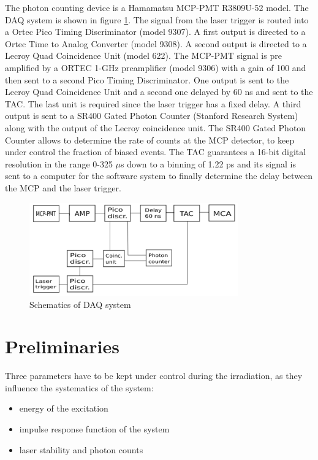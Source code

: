 The photon counting device is a Hamamatsu MCP-PMT R3809U-52 model. The DAQ system is shown in figure \ref{fig:daq}.
The signal from the laser trigger is routed into a Ortec Pico Timing Discriminator (model 9307). A first output is directed to a Ortec Time to Analog Converter (model 9308).
A second output is directed to a Lecroy Quad Coincidence Unit (model 622).
The MCP-PMT signal is pre amplified by a ORTEC 1-GHz preamplifier (model 9306) with a gain of 100 and then sent to a second Pico Timing Discriminator. One output is sent to the Lecroy Quad Coincidence Unit and a second one delayed by 60 ns and sent to the TAC. The last unit is required since the laser trigger has a fixed delay. 
A third output is sent to a SR400 Gated Photon Counter (Stanford Research System) along with the output of the Lecroy coincidence unit.
The SR400 Gated Photon Counter allows to determine the rate of counts at the MCP detector, to keep under control the fraction of biased events.
The TAC guarantees a 16-bit digital resolution in the range 0-325 $\mu$s down to a binning of 1.22 ps and its signal is sent to a computer for the software system to finally determine the delay between the MCP and the laser trigger.
\begin{figure}[htbp]
\begin{center}
\includegraphics[width=9cm]{../Pictures/Chapter_7/electronics.pdf}
\end{center}
\caption[VUV DAQ]{Schematics of DAQ system}
\label{fig:daq}
\end{figure}

\section{Preliminaries}
Three parameters have to be kept under control during the irradiation, as they influence the systematics of the system:
\begin{itemize}
\item energy of the excitation
\item impulse response function of the system
\item laser stability and photon counts
\end{itemize}

